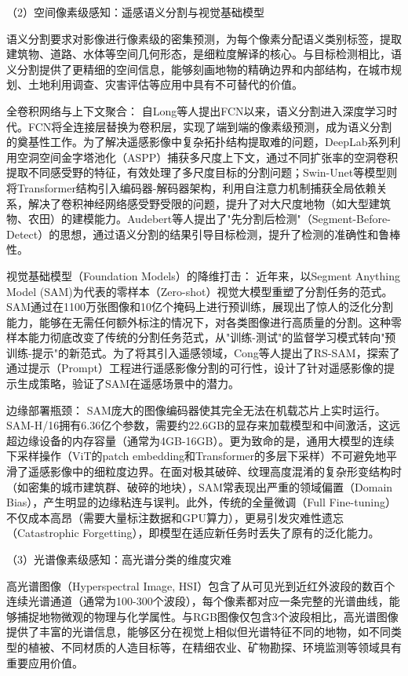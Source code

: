 （2）空间像素级感知：遥感语义分割与视觉基础模型

语义分割要求对影像进行像素级的密集预测，为每个像素分配语义类别标签，提取建筑物、道路、水体等空间几何形态，是细粒度解译的核心。与目标检测相比，语义分割提供了更精细的空间信息，能够刻画地物的精确边界和内部结构，在城市规划、土地利用调查、灾害评估等应用中具有不可替代的价值。

全卷积网络与上下文聚合： 自Long等人提出FCN\cite{long2015fully}以来，语义分割进入深度学习时代。FCN将全连接层替换为卷积层，实现了端到端的像素级预测，成为语义分割的奠基性工作。为了解决遥感影像中复杂拓扑结构提取难的问题，DeepLab系列\cite{chen2018deep}利用空洞空间金字塔池化（ASPP）捕获多尺度上下文，通过不同扩张率的空洞卷积提取不同感受野的特征，有效处理了多尺度目标的分割问题；Swin-Unet\cite{cao2022swin}等模型则将Transformer结构引入编码器-解码器架构，利用自注意力机制捕获全局依赖关系，解决了卷积神经网络感受野受限的问题，提升了对大尺度地物（如大型建筑物、农田）的建模能力。Audebert等人提出了"先分割后检测"（Segment-Before-Detect）的思想\cite{audebert2016segmentation}，通过语义分割的结果引导目标检测，提升了检测的准确性和鲁棒性。

视觉基础模型（Foundation Models）的降维打击： 近年来，以Segment Anything Model (SAM)\cite{kirillov2023segment}为代表的零样本（Zero-shot）视觉大模型重塑了分割任务的范式。SAM通过在1100万张图像和10亿个掩码上进行预训练，展现出了惊人的泛化分割能力，能够在无需任何额外标注的情况下，对各类图像进行高质量的分割。这种零样本能力彻底改变了传统的分割任务范式，从"训练-测试"的监督学习模式转向"预训练-提示"的新范式。为了将其引入遥感领域，Cong等人提出了RS-SAM\cite{cong2023rs}，探索了通过提示（Prompt）工程进行遥感影像分割的可行性，设计了针对遥感影像的提示生成策略，验证了SAM在遥感场景中的潜力。

边缘部署瓶颈： SAM庞大的图像编码器使其完全无法在机载芯片上实时运行。SAM-H/16拥有6.36亿个参数，需要约22.6GB的显存来加载模型和中间激活，这远超边缘设备的内存容量（通常为4GB-16GB）。更为致命的是，通用大模型的连续下采样操作（ViT的patch embedding和Transformer的多层下采样）不可避免地平滑了遥感影像中的细粒度边界。在面对极其破碎、纹理高度混淆的复杂形变结构时（如密集的城市建筑群、破碎的地块），SAM常表现出严重的领域偏置（Domain Bias），产生明显的边缘粘连与误判。此外，传统的全量微调（Full Fine-tuning）不仅成本高昂（需要大量标注数据和GPU算力），更易引发灾难性遗忘（Catastrophic Forgetting），即模型在适应新任务时丢失了原有的泛化能力。

（3）光谱像素级感知：高光谱分类的维度灾难

高光谱图像（Hyperspectral Image, HSI）包含了从可见光到近红外波段的数百个连续光谱通道（通常为100-300个波段），每个像素都对应一条完整的光谱曲线，能够捕捉地物微观的物理与化学属性。与RGB图像仅包含3个波段相比，高光谱图像提供了丰富的光谱信息，能够区分在视觉上相似但光谱特征不同的地物，如不同类型的植被、不同材质的人造目标等，在精细农业、矿物勘探、环境监测等领域具有重要应用价值。


